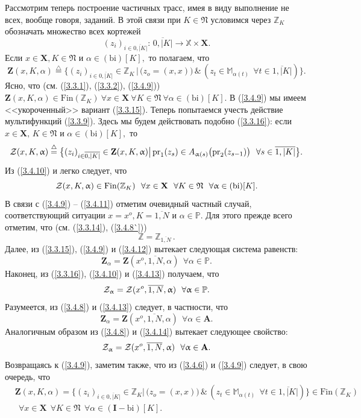 \documentclass[12pt,twoside]{report}
\newcommand{\bfn}{\begin{equation}}
\newcommand{\efn}{\end{equation}}
\newcommand{\df}{\stackrel{\triangle}{=}}
\newcommand{\ov}{\overline}
\newcommand{\al}{\alpha}
\newcommand{\fa}{\forall}
\newcommand{\cz}{{\cal Z}}
\newcommand{\bbz}{{\mathbb Z}}
\newcommand{\bbm}{{\mathbb M}}
\newcommand{\bbx}{{\mathbb X}}
\newcommand{\bbp}{{\mathbb P}}
\begin{document}
Рассмотрим теперь построение частичных трасс, имея в виду выполнение не всех,
вообще говоря, заданий. В этой связи при $K\in\mathfrak{N}$ условимся через $\bbz_K$
обозначать множество всех кортежей
\bfn\label{3.4.8`}
(z_i)_{i\in \ov{0,|K|}}:\,\ov{0,|K|} \longrightarrow \bbx \times \mathbf{X}.
\efn
Если $x\in \mathbf{X}, K\in \mathfrak{N}$ и $\al\in (\mathrm{bi})[K],$ то
полагаем, что
\bfn\label{3.4.9}
\mathbf{Z}(x,K,\al) \df \{(z_i)_{i\in \ov{0,|K|}}\in \bbz_K\,|\,\bigl(z_o=
(x,x)\bigl)\,\&\,(z_t\in \bbm_{\al(t)}\ \ \fa t\in \ov{1,|K|})\}.
\efn
Ясно, что (см. (\ref{3.3.1}), (\ref{3.3.2}), (\ref{3.4.9})) $\mathbf{Z}(x,K,\al)
\in \mathrm{Fin}(\bbz_K)\  \fa x\in \mathbf{X}\  \fa K\in \mathfrak{N}\  \fa
\al\in (\mathrm{bi})[K].$ В (\ref{3.4.9}) мы имеем <<укороченный>> вариант
(\ref{3.3.15}). Теперь попытаемся учесть действие мультифункций (\ref{3.3.9}).
Здесь мы будем действовать подобно (\ref{3.3.16}): если $x\in \mathbf{X},\, K\in
\mathfrak{N}$ и $\al\in (\mathrm{bi})[K],$ то
\bfn\label{3.4.10}\cz(x,K,\al) \df \bigl\{(z_i)_{i\in\ov{0,|K|}}\in \mathbf{Z}
(x,K,\al) \bigl|\,\mathrm{pr}_1(z_s)\in A_{\al(s)}\bigl(\mathrm{pr}_2(z_{s-1})
\bigl)\ \ \fa s\in \ov{1,|K|}\bigl\}.
\efn
Из (\ref{3.4.10}) и \cite[(3.21)]{Cha3`} легко следует, что
\bfn\label{3.4.11}\cz(x,K,\al) \in \mathrm{Fin}(\bbz_K)\ \ \fa x\in
\mathbf{X}\ \ \fa K\in \mathfrak{N}\ \ \fa \al\in (\mathrm{bi})[K].
\efn
В связи с (\ref{3.4.9}) -- (\ref{3.4.11}) отметим очевидный частный случай,
соответствующий ситуации $x = x^o, K = \ov{1,N}$ и $\al\in \bbp.$ Для этого
прежде всего отметим, что (см. (\ref{3.3.14}), (\ref{3.4.8`}))
\bfn\label{3.4.12}\bbz = \bbz_{\ov{1,N}}\,.
\efn
Далее, из (\ref{3.3.15}), (\ref{3.4.9}) и (\ref{3.4.12}) вытекает следующая
система равенств:
\bfn\label{3.4.13}
\mathbf{Z}_\al = \mathbf{Z}(x^o,\ov{1,N},\al) \ \ \fa \al\in \bbp.
\efn
Наконец, из (\ref{3.3.16}), (\ref{3.4.10}) и (\ref{3.4.13})  получаем, что
\bfn\label{3.4.14}\cz_\al = \cz(x^o,\ov{1,N},\al) \ \ \fa \al\in \bbp.
\efn
Разумеется, из (\ref{3.4.8}) и (\ref{3.4.13}) следует, в частности, что
\bfn\label{3.4.15}
\mathbf{Z}_\al = \mathbf{Z}(x^o,\ov{1,N},\al) \ \ \fa \al\in \mathbf{A}.
\efn
Аналогичным образом из (\ref{3.4.8}) и (\ref{3.4.14}) вытекает следующее
свойство:
\bfn\label{3.4.16}\cz_\al = \cz(x^o,\ov{1,N},\al) \ \ \fa \al\in \mathbf{A}.
\efn
Возвращаясь к (\ref{3.4.9}), заметим также, что из (\ref{3.4.6}) и (\ref{3.4.9})
следует, в свою очередь, что
\begin{eqnarray}
&\mathbf{Z}(x,K,\al) = \bigl\{(z_i)_{i\in \ov{0,|K|}} \in \bbz_K\bigl|\,\bigl(z_o =
(x,x)\bigl)\,\&\,(z_t\in \bbm_{\al(t)}\ \ \fa t\in \ov{1,|K|})\bigl\}\in \mathrm{Fin}
(\bbz_K)
&\nonumber\\
&\ \ \fa x\in \mathbf{X}\ \ \fa K\in \mathfrak{N}\ \ \fa \al\in (\mathbf{I}-\mathrm{bi})[K].
&\label{3.4.17}
\end{eqnarray}
\end{document}
